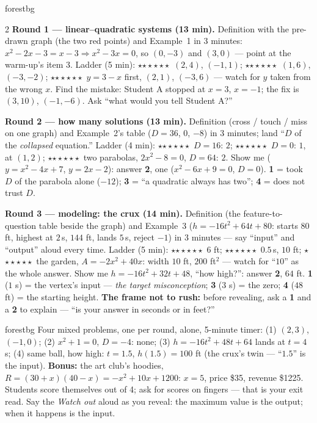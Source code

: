 \documentclass[10pt]{article}
\newcommand{\rung}[1]{{\color{goldacc}\ifcase#1\or$\star$\or$\star\star$\or$\star\star\star$\fi}}
\begin{document}
\begin{skillbox}{forestbg}
\begin{multicols}{2}
\textbf{Round 1 --- linear--quadratic systems (13 min).} Definition with the pre-drawn graph (the
two red points) and Example~1 in 3 minutes: $x^2-2x-3=x-3\Rightarrow x^2-3x=0$, so $(0,-3)$ and
$(3,0)$ --- point at the warm-up's item 3. Ladder (5 min): \rung1\ $(2,4)$, $(-1,1)$;
\rung2\ $(1,6)$, $(-3,-2)$; \rung3\ $y=3-x$ first, $(2,1)$, $(-3,6)$ --- watch for $y$ taken
from the wrong $x$. Find the mistake: Student A stopped at $x=3$, $x=-1$; the fix is
$(3,10)$, $(-1,-6)$. Ask ``what would you tell Student A?''

\textbf{Round 2 --- how many solutions (13 min).} Definition (cross / touch / miss on one graph)
and Example~2's table ($D=36$, $0$, $-8$) in 3 minutes; land ``$D$ of the \emph{collapsed}
equation.'' Ladder (4 min): \rung1\ $D=16$: $2$; \rung2\ $D=0$: $1$, at $(1,2)$;
\rung3\ two parabolas, $2x^2-8=0$, $D=64$: $2$. Show me ($y=x^2-4x+7$, $y=2x-2$): answer
\textbf{2}, one ($x^2-6x+9=0$, $D=0$). \textbf{1} = took $D$ of the parabola alone ($-12$);
\textbf{3} = ``a quadratic always has two''; \textbf{4} = does not trust $D$.

\columnbreak
\textbf{Round 3 --- modeling: the crux (14 min).} Definition (the feature-to-question table
beside the graph) and Example~3 ($h=-16t^2+64t+80$: starts $80$ ft, highest at $2$\,s, $144$
ft, lands $5$\,s, reject $-1$) in 3 minutes --- say ``input'' and ``output'' aloud every time.
Ladder (5 min): \rung1\ $6$ ft; \rung2\ $0.5$\,s, $10$ ft; \rung3\ the garden,
$A=-2x^2+40x$: width $10$ ft, $200$ ft$^2$ --- watch for ``$10$'' as the whole answer. Show me
$h=-16t^2+32t+48$, ``how high?'': answer \textbf{2}, $64$ ft. \textbf{1} ($1$ s) = the vertex's
input --- \emph{the target misconception}; \textbf{3} ($3$ s) = the zero; \textbf{4} ($48$ ft) =
the starting height. \textbf{The frame not to rush:} before revealing, ask a \textbf{1} and a
\textbf{2} to explain --- ``is your answer in seconds or in feet?''
\end{multicols}
\end{skillbox}

\boxguard
\begin{skillbox}{forestbg}
Four mixed problems, one per round, alone, 5-minute timer: (1) $(2,3)$, $(-1,0)$; (2)
$x^2+1=0$, $D=-4$: none; (3) $h=-16t^2+48t+64$ lands at $t=4$\,s; (4) same ball, how high:
$t=1.5$, $h(1.5)=100$ ft (the crux's twin --- ``$1.5$'' is the input). \textbf{Bonus:} the art
club's hoodies, $R=(30+x)(40-x)=-x^2+10x+1200$: $x=5$, price \$35, revenue \$1225. Students
score themselves out of 4; ask for scores on fingers --- that is your exit read. Say the
\emph{Watch out} aloud as you reveal: the maximum value is the output; when it happens is the
input.
\end{skillbox}
\end{document}
